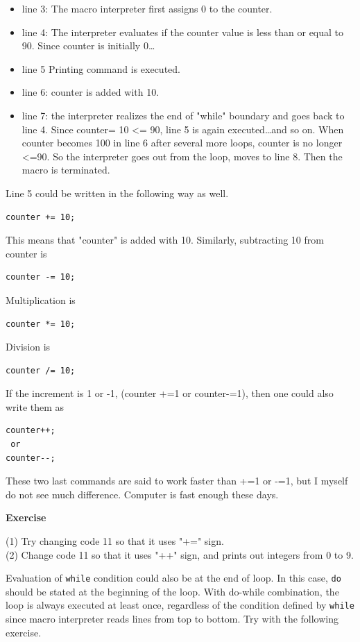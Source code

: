 \documentclass[11pt,a4paper,oneside]{report}
\newenvironment{indentexercise}[1]%
{{\setlength{\leftmargin}{2em}}%
\textbf{Exercise \thesubsection-#1}%
\begin{list}{}%
	\item%
}
{\end{list}}
\newcommand{\ilcom}[1]{\texttt{\small#1}}
\begin{document}
\begin{itemize}
\item line 3: The macro interpreter first assigns 0 to the counter.
\item line 4: The interpreter evaluates if the counter value is less than or equal to 90. Since counter is initially 0\ldots 
\item line 5 Printing command is executed. 
\item line 6: counter is added with 10. 
\item line 7: the interpreter realizes the end of "while" boundary and goes back to line 4. Since counter= 10 <= 90, line 5 is again executed\ldots and so on. When counter becomes 100 in line 6 after several more loops, counter is no longer <=90. So the interpreter goes out from the loop, moves to line 8. Then the macro is terminated.
\end{itemize}

Line 5 could be written in the following way as well.
\begin{lstlisting}[numbers=none]
counter += 10;
\end{lstlisting}
This means that "counter" is added with 10. Similarly, subtracting 10 from counter is 
\begin{lstlisting}[numbers=none]
counter -= 10;
\end{lstlisting}
Multiplication is 
\begin{lstlisting}[numbers=none]
counter *= 10;
\end{lstlisting}
Division is
\begin{lstlisting}[numbers=none]
counter /= 10;
\end{lstlisting}
If the increment is 1 or -1, (counter +=1 or counter-=1), then one could also write them  as 
\begin{lstlisting}[numbers=none]
counter++;
 or 
counter--;
\end{lstlisting}
These two last commands are said to work faster than +=1 or -=1, but I myself do not see much difference. Computer is fast enough these days. 

\begin{indentexercise}{1}
(1) Try changing code 11 so that it uses "+=" sign.\\
(2) Change code 11 so that it uses "++" sign, and prints out integers from 0 to 9.\\
\end{indentexercise}
Evaluation of \ilcom{while} condition could also be at the end of loop. In this case, \ilcom{do} should be stated at the beginning of the loop. With do-while combination, the loop is always executed at least once, regardless of the condition defined by \ilcom{while} since macro interpreter reads lines from top to bottom. Try with the following exercise.
\end{document}

